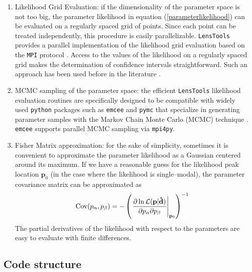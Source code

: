 \documentclass[reprint,aps,prd,superscriptaddress,showkeys,showpacs]{revtex4-1}
\newcommand{\bb}[1]{\mathbf{#1}}
\newcommand{\bbh}[1]{\mathbf{\hat{#1}}}
\newcommand{\ttt}[1]{\texttt{#1}}
\newcommand{\LT}{\texttt{LensTools} }
\begin{document}
\begin{enumerate}

\item Likelihood Grid Evaluation: if the dimensionality of the parameter space is not too big, the parameter likelihood in equation (\ref{parameterlikelihood}) can be evaluated on a regularly spaced grid of points. Since each point can be treated independently, this procedure is easily parallelizable. \LT provides a parallel implementation of the likelihood grid evaluation based on the \ttt{MPI} protocol \citep{MPI}. Access to the values of the likelihood on a regularly spaced grid makes the determination of confidence intervals straightforward. Such an approach has been used before in the literature \citep{cfhtpeaks,cfhtmink}.    

\item MCMC sampling of the parameter space: the efficient \LT likelihood evaluation routines are specifically designed to be compatible with widely used \ttt{python} packages such as \ttt{emcee} \citep{emcee} and \ttt{pymc} \citep{pymc} that specialize in generating parameter samples with the Markov Chain Monte Carlo (MCMC) technique \citep{mcmc}. \ttt{emcee} supports parallel MCMC sampling via \ttt{mpi4py}.    

\item Fisher Matrix approximation: for the sake of simplicity, sometimes it is convenient to approximate the parameter likelihood as a Gaussian centered around its maximum. If we have a reasonable guess for the likelihood peak location $\bb{p}_0$ (in the case where the likelihood is single--modal), the parameter covariance matrix can be approximated as 
\begin{equation}
{\rm Cov}(p_\alpha,p_\beta) = -\left(\left.\frac{\partial\ln\mathcal{L}(\bb{p}\vert\bbh{d})}{\partial p_\alpha\partial p_\beta}\right\vert_{\bb{p}_0}\right)^{-1}
\end{equation}
%
The partial derivatives of the likelihood with respect to the parameters are easy to evaluate with finite differences. 
\end{enumerate}

\subsection{Code structure}
\end{document}
